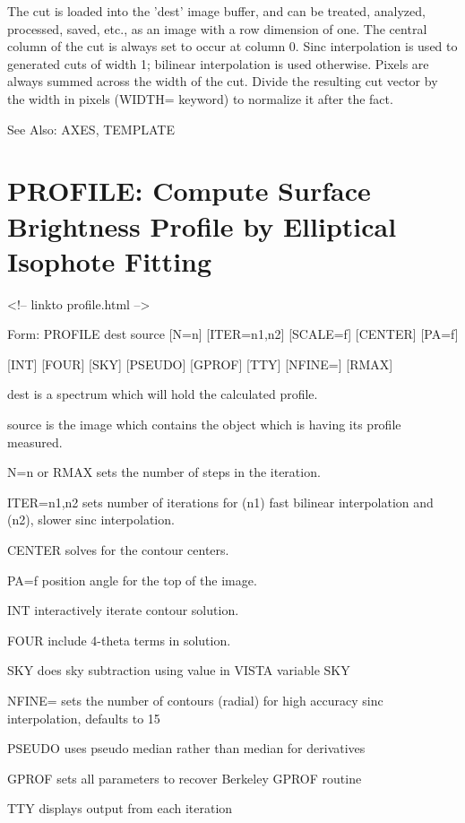 The cut is loaded into the 'dest' image buffer, and can be treated,
analyzed, processed, saved, etc., as an image with a row dimension of one.
The central column of the cut is always set to occur at column 0.  Sinc
interpolation is used to generated cuts of width 1; bilinear interpolation
is used otherwise.  Pixels are always summed across the width of the cut.
Divide the resulting cut vector by the width in pixels (WIDTH= keyword) to
normalize it after the fact.

See Also: AXES, TEMPLATE


\section{PROFILE: Compute Surface Brightness Profile by Elliptical
         Isophote Fitting}
\begin{rawhtml}
<!-- linkto profile.html -->
\end{rawhtml}
\begin{command}
  \item[Form: PROFILE dest source {[N=n]} {[ITER=n1,n2]} {[SCALE=f]} 
       {[CENTER]} {[PA=f]} \hfill]{}
  \item{{[INT]} {[FOUR]} {[SKY]} {[PSEUDO]} {[GPROF]} {[TTY]} {[NFINE=]} 
       {[RMAX]}}
  \item[dest]{is a spectrum which will hold the calculated profile.}
  \item[source]{is the image which contains the object which is
       having its profile measured.}
  \item[N=n or RMAX]{sets the number of steps in the iteration.}
  \item[ITER=n1,n2]{sets number of iterations for (n1) fast bilinear
       interpolation and (n2), slower sinc interpolation.}
  \item[CENTER]{solves for the contour centers.}
  \item[PA=f]{position angle for the top of the image.}
  \item[INT]{interactively iterate contour solution.}
  \item[FOUR]{include 4-theta terms in solution.}
  \item[SKY]{does sky subtraction using value in VISTA variable SKY}
  \item[NFINE=]{sets the number of contours (radial) for high accuracy 
                          sinc interpolation, defaults to 15}
  \item[PSEUDO]{uses pseudo median rather than median for derivatives}
  \item[GPROF]{sets all parameters to recover Berkeley GPROF routine}
  \item[TTY]{displays output from each iteration }
\end{command}

